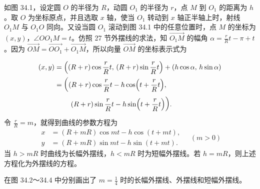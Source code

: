 \hfill
\begin{minipage}[t]{0.53\textwidth}
  \vspace{0pt}
  \hspace{2em}如图 34.1，设定圆 $O$ 的半径为 $R$，动圆 $O_1$ 的半径为 $r$，点 $M$ 到 $O_1$ 的距离为 $h$。取 $O$ 为坐标原点，并且选取 $x$ 轴，使当 $O_1$ 转动到 $x$ 轴正半轴上时，射线 $O_1M$ 与 $O_1O$ 同向。又设当圆 $O_1$ 滚动到图 34.1 中的任意位置时，点 $M$ 的坐标为 $(x, y)$，$\angle OO_1M = t$。仿照 27 节外摆线的求法，知 $\overrightarrow{O_1M}$ 的幅角 $\alpha = \frac{r}{R}t - \pi + t$。因为 $\overrightarrow{OM} = \overrightarrow{OO_1} + \overrightarrow{O_1M}$，所以向量 $\overrightarrow{OM}$ 的坐标表示式为
\end{minipage}

\begin{align*}
  (x, y) &= \Bigl((R+r)\cos\frac{r}{R}t,\, (R+r)\sin\frac{r}{R}t\Bigr) + (h\cos\alpha,\, h\sin\alpha) \\
         &= \biggl((R+r)\cos\frac{r}{R}t - h\cos\Bigl(t + \frac{r}{R}t\Bigr), \\
         &\qquad\ (R+r)\sin\frac{r}{R}t - h\sin\Bigl(t + \frac{r}{R}t\Bigr)\biggr).
\end{align*}
令 $\frac{r}{R}=m$，就得到曲线的参数方程为
\[
  \begin{aligned}
    x &= (R+mR)\cos mt - h\cos(t+mt), \\
    y &= (R+mR)\sin mt - h\sin(t+mt).
  \end{aligned}
  \quad (m>0)
\]
当 $h>mR$ 时曲线为长幅外摆线，$h<mR$ 时为短幅外摆线。若 $h=mR$，则上述方程化为外摆线的方程。

在图 34.2～34.4 中分别画出了 $m=\frac{1}{4}$ 时的长幅外摆线、外摆线和短幅外摆线。

